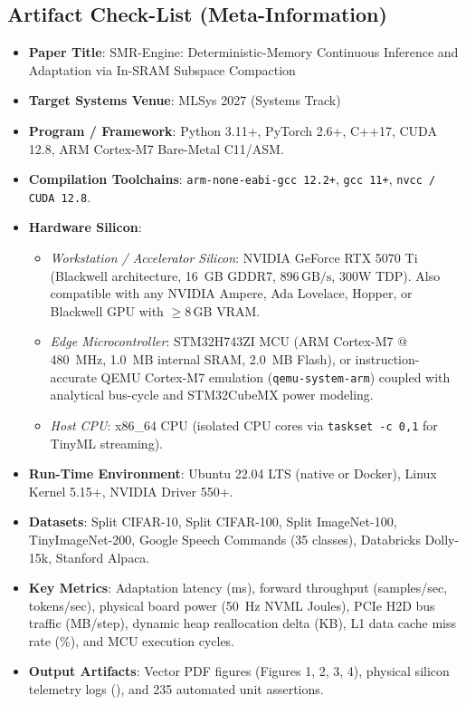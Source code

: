 \documentclass{article}
\begin{document}
\subsection{Artifact Check-List (Meta-Information)}
\begin{itemize}\small\setlength{\itemsep}{1pt}\setlength{\parskip}{0pt}
    \item \textbf{Paper Title}: SMR-Engine: Deterministic-Memory Continuous Inference and Adaptation via In-SRAM Subspace Compaction
    \item \textbf{Target Systems Venue}: MLSys 2027 (Systems Track)
    \item \textbf{Program / Framework}: Python 3.11+, PyTorch 2.6+, C++17, CUDA 12.8, ARM Cortex-M7 Bare-Metal C11/ASM.
    \item \textbf{Compilation Toolchains}: \texttt{arm-none-eabi-gcc 12.2+}, \texttt{gcc 11+}, \texttt{nvcc / CUDA 12.8}.
    \item \textbf{Hardware Silicon}:
    \begin{itemize}\footnotesize
        \item \emph{Workstation / Accelerator Silicon}: NVIDIA GeForce RTX 5070 Ti (Blackwell architecture, 16~GB GDDR7, $896\,\text{GB/s}$, 300W TDP). Also compatible with any NVIDIA Ampere, Ada Lovelace, Hopper, or Blackwell GPU with $\ge 8\,\text{GB}$ VRAM.
        \item \emph{Edge Microcontroller}: STM32H743ZI MCU (ARM Cortex-M7 @ 480~MHz, 1.0~MB internal SRAM, 2.0~MB Flash), or instruction-accurate QEMU Cortex-M7 emulation (\texttt{qemu-system-arm}) coupled with analytical bus-cycle and STM32CubeMX power modeling.
        \item \emph{Host CPU}: x86\_64 CPU (isolated CPU cores via \texttt{taskset -c 0,1} for TinyML streaming).
    \end{itemize}
    \item \textbf{Run-Time Environment}: Ubuntu 22.04 LTS (native or Docker), Linux Kernel 5.15+, NVIDIA Driver 550+.
    \item \textbf{Datasets}: Split CIFAR-10, Split CIFAR-100, Split ImageNet-100, TinyImageNet-200, Google Speech Commands (35 classes), Databricks Dolly-15k, Stanford Alpaca.
    \item \textbf{Key Metrics}: Adaptation latency (ms), forward throughput (samples/sec, tokens/sec), physical board power (50~Hz NVML Joules), PCIe H2D bus traffic (MB/step), dynamic heap reallocation delta (KB), L1 data cache miss rate (\%), and MCU execution cycles.
    \item \textbf{Output Artifacts}: Vector PDF figures (Figures 1, 2, 3, 4), physical silicon telemetry logs (), and 235 automated unit assertions.

\end{itemize}
\end{document}
